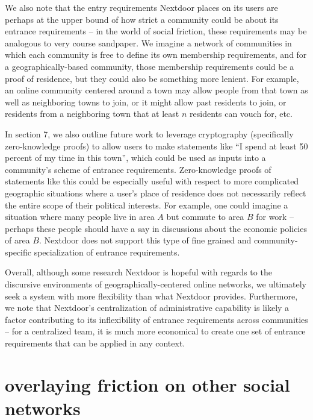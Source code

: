 \documentclass[sigconf,authordraft]{acmart}
\begin{document}
We also note that the entry requirements Nextdoor places on its users are perhaps at the upper bound of how strict a community could be about its entrance requirements -- in the world of social friction, these requirements may be analogous to very course sandpaper. We imagine a network of communities in which each community is free to define its own membership requirements, and for a geographically-based community, those membership requirements could be a proof of residence, but they could also be something more lenient. For example, an online community centered around a town may allow people from that town as well as neighboring towns to join, or it might allow past residents to join, or residents from a neighboring town that at least $n$ residents can vouch for, etc. 

In section 7, we also outline future work to leverage cryptography (specifically zero-knowledge proofs) to allow users to make statements like ``I spend at least 50 percent of my time in this town'', which could be used as inputs into a community's scheme of entrance requirements. Zero-knowledge proofs of statements like this could be especially useful with respect to more complicated geographic situations where a user's place of residence does not necessarily reflect the entire scope of their political interests. For example, one could imagine a situation where many people live in area $A$ but commute to area $B$ for work -- perhaps these people should have a say in discussions about the economic policies of area $B$. Nextdoor does not support  this type of fine grained and community-specific specialization of entrance requirements.

Overall, although some research Nextdoor is hopeful with regards to the discursive environments of geographically-centered online networks, we ultimately seek a system with more flexibility than what Nextdoor provides. Furthermore, we note that Nextdoor's centralization of administrative capability is likely a factor contributing to its inflexibility of entrance requirements across communities -- for a centralized team, it is much more economical to create one set of entrance requirements that can be applied in any context.

\section{overlaying friction on other social networks}
\end{document}
